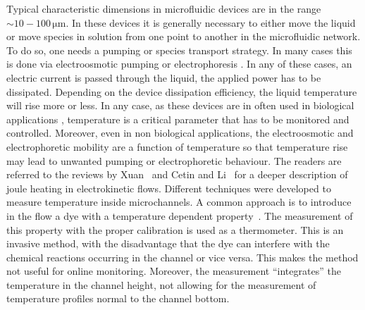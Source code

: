\documentclass[twocolumn]{svjour3}       %
\begin{document}
Typical characteristic dimensions in microfluidic devices are in the range $\sim10-100\, \mathrm{\mu m}$. In these devices it is generally necessary to either move the liquid or move species in solution from one point to another in the microfluidic network. To do so, one needs a pumping or species transport strategy. In many cases this is done via electroosmotic pumping or electrophoresis \cite{hunter2001,lyklema1995}. In any of these cases, an electric current is passed through the liquid, the applied power has to be dissipated. Depending on the device dissipation efficiency, the liquid temperature will rise more or less. In any case, as these devices are in often used in biological applications \cite{tian2008}, temperature is a critical parameter that has to be monitored and controlled. Moreover, even in non biological applications, the electroosmotic and electrophoretic mobility are a function of temperature \cite{tang2006} so that temperature rise may lead to unwanted pumping or electrophoretic behaviour. The readers are referred to the reviews by Xuan~\cite{xuan2008} and Cetin and Li~\cite{cetin2008} for a deeper description of joule heating in electrokinetic flows. 
Different techniques were developed to measure temperature inside microchannels. A common approach is to introduce in the flow a dye with a temperature dependent property~\cite{tang2006,ross2001,erickson2003,dye1,dye2}. The measurement of this property with the proper calibration is used as a thermometer. This is an invasive method, with the disadvantage that the dye can interfere with the chemical reactions occurring in the channel or vice versa. This makes the method not useful for online monitoring. Moreover, the measurement ``integrates'' the temperature in the channel height, not allowing for the measurement of temperature profiles normal to the channel bottom. 
\end{document}
